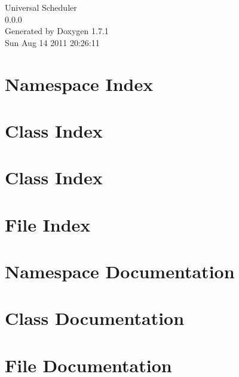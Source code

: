 \documentclass[a4paper]{book}
\begin{document}
\hypersetup{pageanchor=false}
\begin{titlepage}
\vspace*{7cm}
\begin{center}
{\Large Universal Scheduler \\[1ex]\large 0.0.0 }\\
\vspace*{1cm}
{\large Generated by Doxygen 1.7.1}\\
\vspace*{0.5cm}
{\small Sun Aug 14 2011 20:26:11}\\
\end{center}
\end{titlepage}
\clearemptydoublepage
{}
\tableofcontents
\clearemptydoublepage
{}
\hypersetup{pageanchor=true}
\chapter{Namespace Index}

\chapter{Class Index}

\chapter{Class Index}

\chapter{File Index}

\chapter{Namespace Documentation}

\chapter{Class Documentation}

















\chapter{File Documentation}















\printindex
\end{document}
